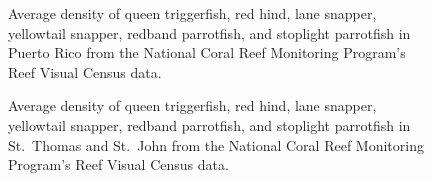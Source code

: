 \documentclass[
  letterpaper,
  oneside,
  open=any]{scrbook}
\begin{document}
\begin{figure}


\caption{\label{fig-RVCPR}Average density of queen triggerfish, red
hind, lane snapper, yellowtail snapper, redband parrotfish, and
stoplight parrotfish in Puerto Rico from the National Coral Reef
Monitoring Program's Reef Visual Census data.}

\end{figure}%

\begin{figure}


\caption{\label{fig-RVCSTSJ}Average density of queen triggerfish, red
hind, lane snapper, yellowtail snapper, redband parrotfish, and
stoplight parrotfish in St.~Thomas and St.~John from the National Coral
Reef Monitoring Program's Reef Visual Census data.}

\end{figure}%
\end{document}
